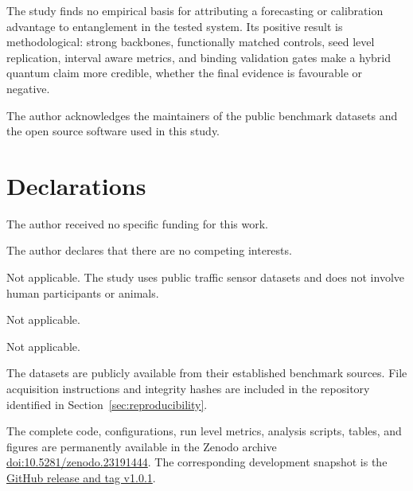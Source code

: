 \documentclass[pdflatex,sn-mathphys-num]{sn-jnl}
\begin{document}
The study finds no empirical basis for attributing a forecasting or calibration advantage to entanglement in the tested system. Its positive result is methodological: strong backbones, functionally matched controls, seed level replication, interval aware metrics, and binding validation gates make a hybrid quantum claim more credible, whether the final evidence is favourable or negative.

\backmatter


The author acknowledges the maintainers of the public benchmark datasets and the open source software used in this study.

\section*{Declarations}


The author received no specific funding for this work.


The author declares that there are no competing interests.


Not applicable. The study uses public traffic sensor datasets and does not involve human participants or animals.


Not applicable.


Not applicable.


The datasets are publicly available from their established benchmark sources. File acquisition instructions and integrity hashes are included in the repository identified in Section~\ref{sec:reproducibility}.


The complete code, configurations, run level metrics, analysis scripts, tables, and figures are permanently available in the Zenodo archive \href{https://doi.org/10.5281/zenodo.23191444}{doi:10.5281/zenodo.23191444}. The corresponding development snapshot is the \href{https://github.com/shishirbit/Quantum-Enhanced-Framework-for-Traffic-Speed-Forecasting-with-Calibrated-Uncertainty/releases/tag/v1.0.1}{GitHub release and tag v1.0.1}.
\end{document}
